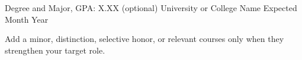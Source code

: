 

\begin{cventries}

  \cventry
    {Degree and Major, GPA: X.XX (optional)} %
    {University or College Name} %
    {} %
    {Expected Month Year} %
    {
      \begin{cvitems}
        \item {Add a minor, distinction, selective honor, or relevant courses only when they strengthen your target role.}
      \end{cvitems}
    }

\end{cventries}
